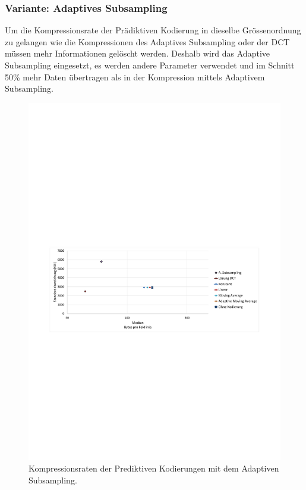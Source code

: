 \subsubsection{Variante: Adaptives Subsampling} \label{resultate:loesung2:adaptive}
Um die Kompressionsrate der Prädiktiven Kodierung in dieselbe Grössenordnung zu gelangen wie die Kompressionen des Adaptives Subsampling oder der DCT müssen mehr Informationen gelöscht werden. Deshalb wird das Adaptive Subsampling eingesetzt, es werden andere Parameter verwendet und im Schnitt 50\% mehr Daten übertragen als in der Kompression mittels Adaptivem Subsampling.

\begin{figure}[!htbp]
	\center
	\includegraphics[trim = 1.8cm 11cm 1.8cm 12.5cm, clip=true,
width=1\textwidth,keepaspectratio]{./pictures/resultate/loesung2/variante1/resultate_euler.pdf}
	\caption{Kompressionsraten der Prediktiven Kodierungen mit dem Adaptiven Subsampling.}
	\label{resultate:loesung2:adaptive:euler}
\end{figure}
